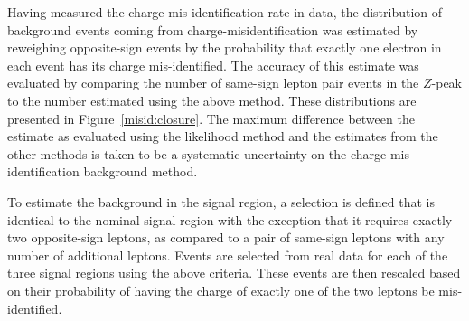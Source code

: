 Having measured the charge mis-identification rate in data, the distribution of background events coming from charge-misidentification was estimated by reweighing opposite-sign events by the probability that exactly one electron in each event has its charge mis-identified.
The accuracy of this estimate was evaluated by comparing the number of same-sign lepton pair events in the $Z$-peak to the number estimated using the above method.
These distributions are presented in Figure~\ref{misid:closure}.
The maximum difference between the estimate as evaluated using the likelihood method and the estimates from the other methods is taken to be a systematic uncertainty on the charge mis-identification background method.



To estimate the background in the signal region, a selection is defined that is identical to the nominal signal region with the exception that it requires exactly two opposite-sign leptons, as compared to a pair of same-sign leptons with any number of additional leptons.
Events are selected from real data for each of the three signal regions using the above criteria.
These events are then rescaled based on their probability of having the charge of exactly one of the two leptons be mis-identified.


